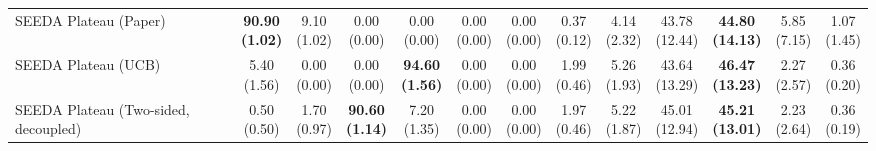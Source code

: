 \begin{table}[H]
{\begin{tabular}{l|cccccc|cccccc}
SEEDA Plateau (Paper) & \bfseries \makecell{90.90 \\ (1.02)} & \makecell{9.10 \\ (1.02)} & {\cellcolor[HTML]{C8E6C9}} \makecell{0.00 \\ (0.00)} & \makecell{0.00 \\ (0.00)} & \makecell{0.00 \\ (0.00)} & \makecell{0.00 \\ (0.00)} & \makecell{0.37 \\ (0.12)} & \makecell{4.14 \\ (2.32)} & {\cellcolor[HTML]{C8E6C9}} \makecell{43.78 \\ (12.44)} & \bfseries \makecell{44.80 \\ (14.13)} & \makecell{5.85 \\ (7.15)} & \makecell{1.07 \\ (1.45)} \\
SEEDA Plateau (UCB) & \makecell{5.40 \\ (1.56)} & \makecell{0.00 \\ (0.00)} & {\cellcolor[HTML]{C8E6C9}} \makecell{0.00 \\ (0.00)} & \bfseries \makecell{94.60 \\ (1.56)} & \makecell{0.00 \\ (0.00)} & \makecell{0.00 \\ (0.00)} & \makecell{1.99 \\ (0.46)} & \makecell{5.26 \\ (1.93)} & {\cellcolor[HTML]{C8E6C9}} \makecell{43.64 \\ (13.29)} & \bfseries \makecell{46.47 \\ (13.23)} & \makecell{2.27 \\ (2.57)} & \makecell{0.36 \\ (0.20)} \\
SEEDA Plateau (Two-sided, decoupled) & \makecell{0.50 \\ (0.50)} & \makecell{1.70 \\ (0.97)} & {\cellcolor[HTML]{C8E6C9}} \bfseries \makecell{90.60 \\ (1.14)} & \makecell{7.20 \\ (1.35)} & \makecell{0.00 \\ (0.00)} & \makecell{0.00 \\ (0.00)} & \makecell{1.97 \\ (0.46)} & \makecell{5.22 \\ (1.87)} & {\cellcolor[HTML]{C8E6C9}} \makecell{45.01 \\ (12.94)} & \bfseries \makecell{45.21 \\ (13.01)} & \makecell{2.23 \\ (2.64)} & \makecell{0.36 \\ (0.19)} \\

\end{tabular}}
\end{table}

